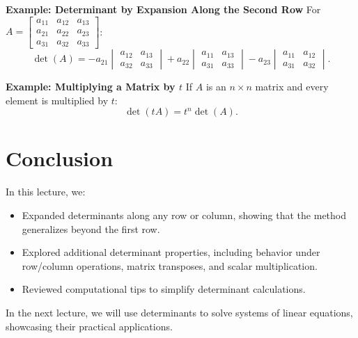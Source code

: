 \documentclass{article}
\begin{document}
\textbf{Example: Determinant by Expansion Along the Second Row}
For $A =
\begin{bmatrix}
  a_{11} & a_{12} & a_{13} \\
  a_{21} & a_{22} & a_{23} \\
  a_{31} & a_{32} & a_{33}
\end{bmatrix}$:
\[
  \det(A) = -a_{21}
  \begin{vmatrix}
    a_{12} & a_{13} \\
    a_{32} & a_{33}
  \end{vmatrix}
  + a_{22}
  \begin{vmatrix}
    a_{11} & a_{13} \\
    a_{31} & a_{33}
  \end{vmatrix}
  - a_{23}
  \begin{vmatrix}
    a_{11} & a_{12} \\
    a_{31} & a_{32}
  \end{vmatrix}.
\]

\textbf{Example: Multiplying a Matrix by $t$}
If $A$ is an $n \times n$ matrix and every element is multiplied by $t$:
\[
  \det(tA) = t^n \det(A).
\]

\section*{Conclusion}

In this lecture, we:
\begin{itemize}
  \item Expanded determinants along any row or column, showing that the method generalizes beyond the first row.
  \item Explored additional determinant properties, including behavior under row/column operations, matrix transposes, and scalar multiplication.
  \item Reviewed computational tips to simplify determinant calculations.
\end{itemize}

In the next lecture, we will use determinants to solve systems of linear equations, showcasing their practical applications.
\end{document}
